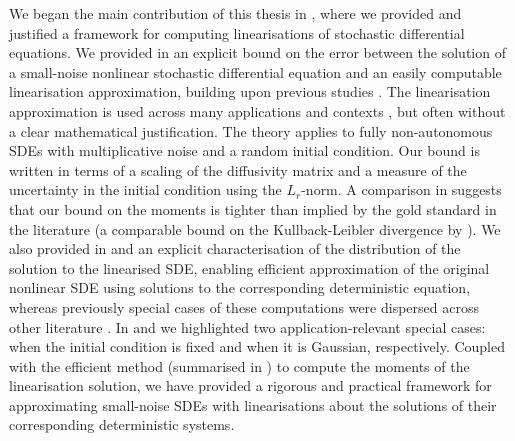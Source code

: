 We began the main contribution of this thesis in , where we provided and justified a framework for computing linearisations of stochastic differential equations.
We provided in  an explicit bound on the error between the solution of a small-noise nonlinear stochastic differential equation and an easily computable linearisation approximation, building upon previous studies \citep{Blagoveshchenskii_1962_DiffusionProcessesDepending,FreidlinWentzell_1998_RandomPerturbationsDynamical,Sanz-AlonsoStuart_2017_GaussianApproximationsSmall}.
The linearisation approximation is used across many applications and contexts \citep[e.g.]{Jazwinski_2014_StochasticProcessesFiltering, Sanz-AlonsoStuart_2017_GaussianApproximationsSmall,KaszasHaller_2020_UniversalUpperEstimate,ArchambeauEtAl_2007_GaussianProcessApproximations}, but often without a clear mathematical justification.
The theory applies to fully non-autonomous SDEs with multiplicative noise and a random initial condition.
Our bound is written in terms of a scaling of the diffusivity matrix and a measure of the uncertainty in the initial condition using the \(L_r\)-norm.
A comparison in  suggests that our bound on the moments is tighter than implied by the gold standard in the literature (a comparable bound on the Kullback-Leibler divergence by \citet{Sanz-AlonsoStuart_2017_GaussianApproximationsSmall}).
We also provided in  and  an explicit characterisation of the distribution of the solution to the linearised SDE, enabling efficient approximation of the original nonlinear SDE using solutions to the corresponding deterministic equation, whereas previously special cases of these computations were dispersed across other literature \citep[e.g.]{Jazwinski_2014_StochasticProcessesFiltering,Sanz-AlonsoStuart_2017_GaussianApproximationsSmall,SarkkaSolin_2019_AppliedStochasticDifferential}.
In  and  we highlighted two application-relevant special cases: when the initial condition is fixed and when it is Gaussian, respectively.
Coupled with the efficient \citet{Mazzoni_2008_ComputationalAspectsContinuous} method (summarised in ) to compute the moments of the linearisation solution, we have provided a rigorous and practical framework for approximating small-noise SDEs with linearisations about the solutions of their corresponding deterministic systems.


